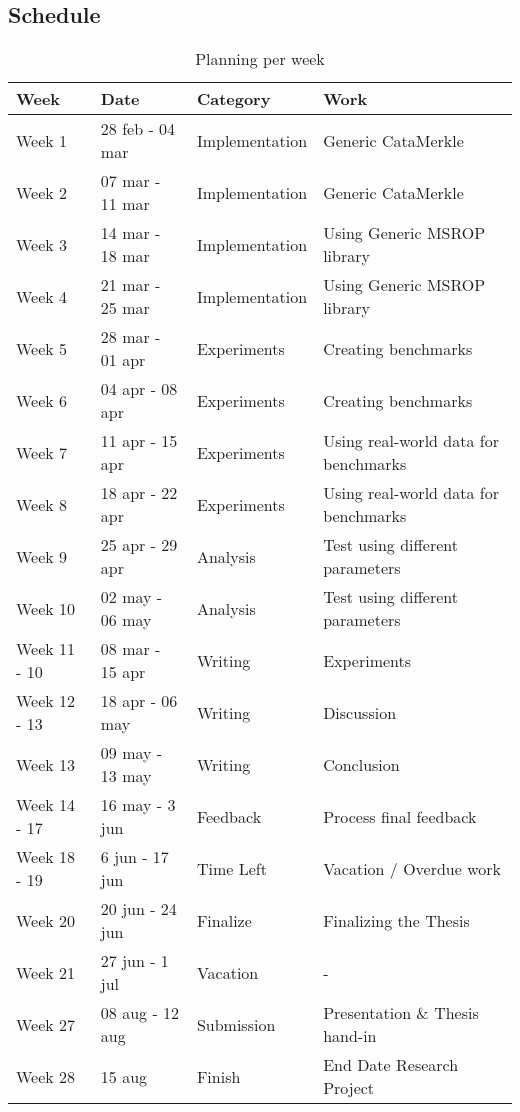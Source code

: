 \subsection{Schedule}
\begin{table}[H]
\setlength{\tabcolsep}{8pt}
\centering
\small
\bigskip
\begin{tabularx}{0.965\textwidth}{|l|l|l|l|}
    \hline
    Week & Date & Category & Work \\
    \hline
    Week 1 & 28 feb - 04 mar & Implementation & Generic CataMerkle \\
    Week 2 & 07 mar - 11 mar & Implementation & Generic CataMerkle \\
    Week 3 & 14 mar - 18 mar & Implementation & Using Generic MSROP library \\
    Week 4 & 21 mar - 25 mar & Implementation & Using Generic MSROP library \\
    \hline
    Week 5 & 28 mar - 01 apr & Experiments & Creating benchmarks \\
    Week 6 & 04 apr - 08 apr & Experiments & Creating benchmarks \\
    Week 7 & 11 apr - 15 apr & Experiments & Using real-world data for benchmarks \\
    Week 8 & 18 apr - 22 apr & Experiments & Using real-world data for benchmarks \\
    \hline
    Week 9 & 25 apr - 29 apr & Analysis & Test using different parameters  \\
    Week 10 & 02 may - 06 may & Analysis & Test using different parameters  \\
    \hline
    Week 11 - 10 & 08 mar - 15 apr & Writing & Experiments \\
    Week 12 - 13 & 18 apr - 06 may & Writing & Discussion \\
    Week 13 & 09 may - 13 may & Writing & Conclusion \\
    \hline
    Week 14 - 17 & 16 may - 3 jun & Feedback & Process final feedback \\
    \hline
    Week 18 - 19 & 6 jun - 17 jun & Time Left & Vacation / Overdue work \\
    \hline
    Week 20 & 20 jun - 24 jun & Finalize & Finalizing the Thesis \\
    \hline
    Week 21 & 27 jun - 1 jul & Vacation & - \\
    \hline
    Week 27 & 08 aug - 12 aug & Submission & Presentation \& Thesis hand-in \\
    \hline 
    Week 28 & 15 aug & Finish & End Date Research Project \\
    \hline
\end{tabularx}
\caption{Planning per week}
\label{table:planning}
\end{table}